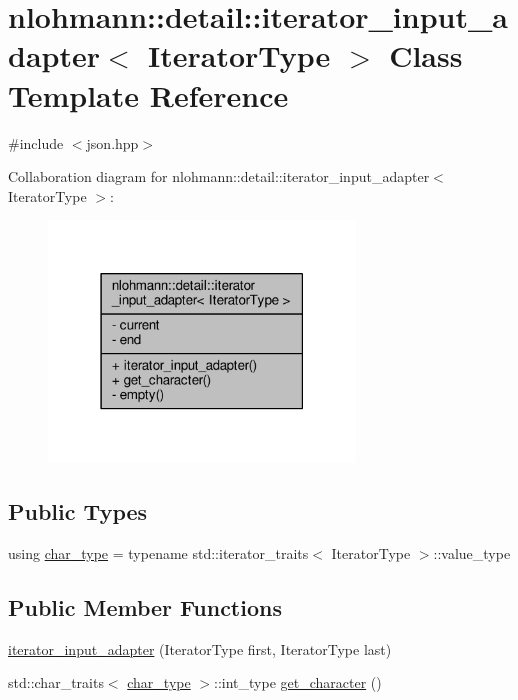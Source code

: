 \hypertarget{classnlohmann_1_1detail_1_1iterator__input__adapter}{}\section{nlohmann\+:\+:detail\+:\+:iterator\+\_\+input\+\_\+adapter$<$ Iterator\+Type $>$ Class Template Reference}
\label{classnlohmann_1_1detail_1_1iterator__input__adapter}


{\ttfamily \#include $<$json.\+hpp$>$}



Collaboration diagram for nlohmann\+:\+:detail\+:\+:iterator\+\_\+input\+\_\+adapter$<$ Iterator\+Type $>$\+:
\nopagebreak
\begin{figure}[H]
\begin{center}
\leavevmode
\includegraphics[width=231pt]{classnlohmann_1_1detail_1_1iterator__input__adapter__coll__graph}
\end{center}
\end{figure}
\subsection*{Public Types}
\begin{DoxyCompactItemize}
\item 
using \hyperlink{classnlohmann_1_1detail_1_1iterator__input__adapter_a7cc60e68767005322ab4b692c9dff283}{char\+\_\+type} = typename std\+::iterator\+\_\+traits$<$ Iterator\+Type $>$\+::value\+\_\+type
\end{DoxyCompactItemize}
\subsection*{Public Member Functions}
\begin{DoxyCompactItemize}
\item 
\hyperlink{classnlohmann_1_1detail_1_1iterator__input__adapter_a9423d7166b9e3092f149266acd064ba7}{iterator\+\_\+input\+\_\+adapter} (Iterator\+Type first, Iterator\+Type last)
\item 
std\+::char\+\_\+traits$<$ \hyperlink{classnlohmann_1_1detail_1_1iterator__input__adapter_a7cc60e68767005322ab4b692c9dff283}{char\+\_\+type} $>$\+::int\+\_\+type \hyperlink{classnlohmann_1_1detail_1_1iterator__input__adapter_a01706f07681df083c2174d236ff3d643}{get\+\_\+character} ()
\end{DoxyCompactItemize}
